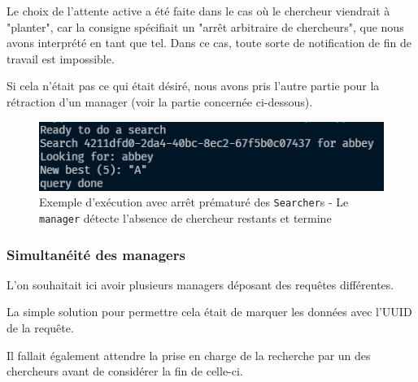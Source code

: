 \documentclass[headings=standardclasses,parskip=half]{scrartcl}
\begin{document}
Le choix de l'attente active a été faite dans le cas où le chercheur viendrait à "planter", car la consigne spécifiait un
"arrêt arbitraire de chercheurs", que nous avons interprété en tant que tel. Dans ce cas, toute sorte
de notification de fin de travail est impossible.

Si cela n'était pas ce qui était désiré, nous avons pris l'autre partie pour la rétraction d'un manager
(voir la partie concernée ci-dessous).

\begin{figure}[h]
    \centering
    \includegraphics[scale=0.5]{arret-chercheurs.png}
    \caption{Exemple d'exécution avec arrêt prématuré des \texttt{Searcher}s -
        Le \texttt{manager} détecte l'absence de chercheur restants et termine}
\end{figure}

\subsubsection{Simultanéité des managers}

L'on souhaitait ici avoir plusieurs managers déposant des requêtes différentes.

La simple solution pour permettre cela était de marquer les données avec l'UUID de la requête.

Il fallait également attendre la prise en charge de la recherche par un des chercheurs avant
de considérer la fin de celle-ci.
\end{document}

